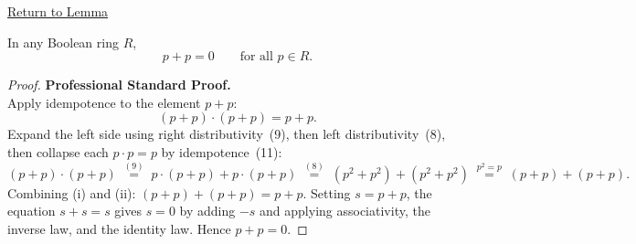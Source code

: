 
\newpage
{}
\label{prf:boolean-ring-self-additive-inverse}

\begin{remark*}[Return]
\hyperref[lem:self-additive-inverse]{Return to Lemma}
\end{remark*}

\begin{lemma*}
In any Boolean ring $R$,
\[
p + p = 0 \qquad \text{for all } p \in R.
\]
\end{lemma*}

\begin{proof}
\textbf{Professional Standard Proof.}~\\
Apply idempotence to the element $p + p$:
\[
(p + p) \cdot (p + p) = p + p. \tag{i}
\]
Expand the left side using right distributivity~(9), then left
distributivity~(8), then collapse each $p \cdot p = p$ by
idempotence~(11):
\[
(p + p) \cdot (p + p)
  \;\overset{(9)}{=}\; p\cdot(p+p) + p\cdot(p+p)
  \;\overset{(8)}{=}\; (p^2 + p^2) + (p^2 + p^2)
  \;\overset{p^2=p}{=}\; (p + p) + (p + p). \tag{ii}
\]
Combining (i) and (ii): $(p+p) + (p+p) = p+p$.
Setting $s = p+p$, the equation $s + s = s$ gives $s = 0$
by adding $-s$ and applying associativity, the inverse law,
and the identity law.
Hence $p + p = 0$.
\end{proof}

